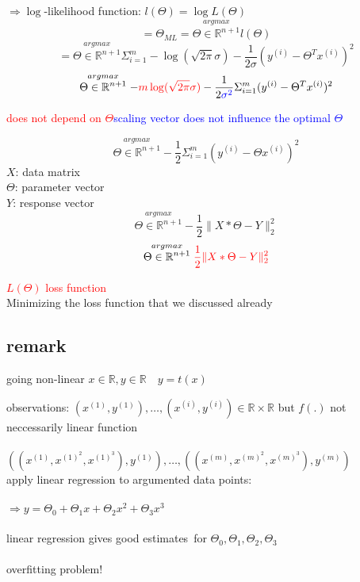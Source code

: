 \begin{enumerate}[(1)]
$\Rightarrow \log$-likelihood function: $l(\Theta) = \log L(\Theta)$
\[ = \Theta_{ML} = \stackrel{argmax}{\Theta \in \mathbb{R}^{n+1}} l(\Theta)\]
\[ = \stackrel{argmax}{\Theta \in \mathbb{R}^{n+1}} \Sigma^m_{i=1} - \log (\sqrt{2\pi}\sigma) - \frac{1}{2\sigma}(y^{(i)} - \Theta^T x^{(i)})^2\]
\[\stackrel{argmax}{\Theta \in \mathbb{R}^{n+1}} - \textcolor{red}{m \log (\sqrt{2\pi}\sigma)} - \frac{1}{2\textcolor{blue}{\sigma^2}}\Sigma^m_{i=1}(y^{(i)} - \Theta^T x^{(i)})^2  \]
\begin{center}
\textcolor{red}{does not depend on $\Theta$}\space\space\space \textcolor{blue}{scaling vector does not influence the optimal $\Theta$}
\end{center}
\[ \stackrel{argmax}{\Theta \in \mathbb{R}^{n+1}} -\frac{1}{2} \Sigma^m_{i=1}(y^{(i)}-\Theta x^{(i)})^2\]
$X$: data matrix\\
$\Theta$: parameter vector\\
$Y$: response vector
\[\stackrel{argmax}{\Theta \in \mathbb{R}^{n+1}} -\frac{1}{2} \lVert X * \Theta - Y \lVert^2_2\]
\[ \stackrel{argmax}{\Theta \in \mathbb{R}^{n+1}} \textcolor{red}{\frac{1}{2} \lVert X * \Theta - Y \lVert^2_2}\]
\begin{center}
\textcolor{red}{$L(\Theta)$ loss function}\\
Minimizing the loss function that we discussed already\\
\end{center}
\end{enumerate}
\subsection*{remark} going non-linear $x \in \mathbb{R}, y \in \mathbb{R} \quad y=t(x)$
\begin{addmargin}[2 cm]{0 cm}
observations: $(x^{(1)}, y^{(1)}), \dots ,(x^{(i)}, y^{(i)}) \in \mathbb{R} \times \mathbb{R}$ but $f(.)$ not neccessarily linear function\\\\
$((x^{(1)},x^{(1)^2}, x^{(1)^3}), y^{(1)}), \dots , ((x^{(m)},x^{(m)^2}, x^{(m)^3}), y^{(m)})$\\
apply linear regression to argumented data points:\\\\
$\Rightarrow y = \Theta_0 + \Theta_1  x + \Theta_2  x^2 + \Theta_3 x^3$\\\\
linear regression gives \glqq good estimates\grqq\ for $\Theta_0, \Theta_1, \Theta_2, \Theta_3$\\\\
overfitting problem!
\end{addmargin} 

